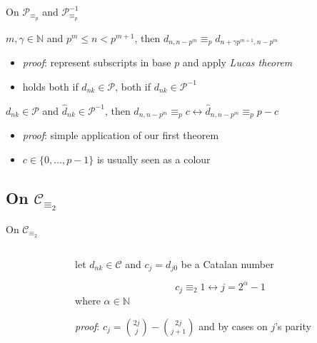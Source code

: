 \documentclass[10pt,serif, professionalfont]{beamer}
\begin{document}
\begin{frame}{On $\mathcal{P}_{\equiv_{p}}$ and $\mathcal{P}_{\equiv_{p}}^{-1}$}
    \begin{theorem}
        $m, \gamma \in \mathbb{N}$ and $p^{m} \leq n < p^{m+1}$, then 
            $d_{n,n-p^{m}} \equiv_{p} d_{n+\gamma p^{m+1}, n-p^{m}}$
    \end{theorem}
    \begin{itemize}
        \item \emph{proof}: represent subscripts in base $p$ and apply \emph{Lucas theorem}
        \item holds both if $d_{nk}\in\mathcal{P}$, both if $d_{nk}\in\mathcal{P}^{-1}$
    \end{itemize}
    \pause
    \begin{theorem}
        $d_{nk}\in\mathcal{P}$ and $\hat{d}_{nk}\in\mathcal{P}^{-1}$, then
            \indent $d_{n,n-p^{m}} \equiv_{p} c \leftrightarrow \hat{d}_{n,n-p^{m}} \equiv_{p} p-c$
    \end{theorem}
    \begin{itemize}
        \item \emph{proof}: simple application of our first theorem
        \item $c\in\lbrace0,\ldots,p-1\rbrace$ is usually seen as a colour
    \end{itemize}
\end{frame}

\subsection{On $\mathcal{C}_{\equiv_{2}}$}

\begin{frame}{On $\mathcal{C}_{\equiv_{2}}$}
    \begin{columns}[T] %
        \begin{column}[T]{5cm} %
            
        \end{column}
        \begin{column}[T]{5cm} %
            let $d_{nk}\in\mathcal{C}$ and $c_{j}=d_{j0}$ be a Catalan number
            \begin{theorem}
                \begin{displaymath}
                    c_{j} \equiv_{2}1 \leftrightarrow j=2^{\alpha}-1
                \end{displaymath}
                where $\alpha\in\mathbb{N}$
            \end{theorem}
            \emph{proof}: $c_{j} = {{2j}\choose{j}} - {{2j}\choose{j+1}}$ and by cases on $j$'s parity
        \end{column}
    \end{columns}
\end{frame}
\end{document}
